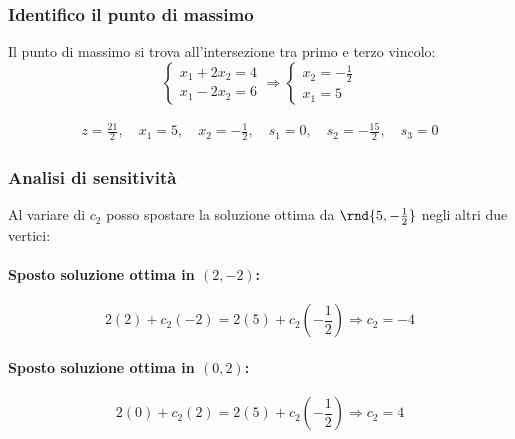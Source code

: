 \documentclass[\main/main.tex]{subfiles}
\begin{document}
\subsubsection*{Identifico il punto di massimo}
Il punto di massimo si trova all'intersezione tra primo e terzo vincolo:
\[
  \begin{cases}
    x_1 + 2x_2 = 4 \\
    x_1 - 2x_2 = 6
  \end{cases}
  \Rightarrow
  \begin{cases}
    x_2 = -\frac{1}{2} \\
    x_1 = 5
  \end{cases}
\]

\begin{align*}
  z   = \frac{21}{2}  ,\quad
  x_1 = 5             ,\quad
  x_2 = -\frac{1}{2}  ,\quad
  s_1 = 0             ,\quad
  s_2 = -\frac{15}{2} ,\quad
  s_3 = 0
\end{align*}

\subsubsection*{Analisi di sensitività}
Al variare di $c_2$ posso spostare la soluzione ottima da $\rnd{5, -\frac{1}{2}}$ negli altri due vertici:

\paragraph*{Sposto soluzione ottima in $(2,-2)$:}

\[
  2(2) + c_2(-2) = 2(5) + c_2(-\frac{1}{2}) \Rightarrow c_2 = -4
\]
\paragraph*{Sposto soluzione ottima in $(0,2)$:}

\[
  2(0) + c_2(2) = 2(5) + c_2(-\frac{1}{2}) \Rightarrow c_2 = 4
\]
\end{document}
